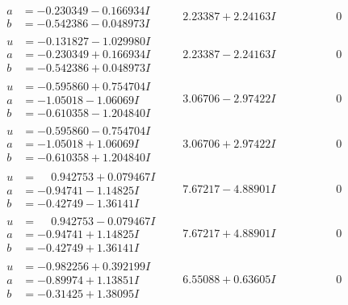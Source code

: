 \documentclass[1p]{elsarticle_modified}
\theoremstyle{definition}
\begin{document}
$$\begin{array}{c|c|c}
\begin{aligned}
a &= -0.230349 - 0.166934 I \\
b &= -0.542386 - 0.048973 I\end{aligned}
 & \phantom{-}2.23387 + 2.24163 I & \phantom{-0.000000 } 0 \\ \hline\begin{aligned}
u &= -0.131827 - 1.029980 I \\
a &= -0.230349 + 0.166934 I \\
b &= -0.542386 + 0.048973 I\end{aligned}
 & \phantom{-}2.23387 - 2.24163 I & \phantom{-0.000000 } 0 \\ \hline\begin{aligned}
u &= -0.595860 + 0.754704 I \\
a &= -1.05018 - 1.06069 I \\
b &= -0.610358 - 1.204840 I\end{aligned}
 & \phantom{-}3.06706 - 2.97422 I & \phantom{-0.000000 } 0 \\ \hline\begin{aligned}
u &= -0.595860 - 0.754704 I \\
a &= -1.05018 + 1.06069 I \\
b &= -0.610358 + 1.204840 I\end{aligned}
 & \phantom{-}3.06706 + 2.97422 I & \phantom{-0.000000 } 0 \\ \hline\begin{aligned}
u &= \phantom{-}0.942753 + 0.079467 I \\
a &= -0.94741 - 1.14825 I \\
b &= -0.42749 - 1.36141 I\end{aligned}
 & \phantom{-}7.67217 - 4.88901 I & \phantom{-0.000000 } 0 \\ \hline\begin{aligned}
u &= \phantom{-}0.942753 - 0.079467 I \\
a &= -0.94741 + 1.14825 I \\
b &= -0.42749 + 1.36141 I\end{aligned}
 & \phantom{-}7.67217 + 4.88901 I & \phantom{-0.000000 } 0 \\ \hline\begin{aligned}
u &= -0.982256 + 0.392199 I \\
a &= -0.89974 + 1.13851 I \\
b &= -0.31425 + 1.38095 I\end{aligned}
 & \phantom{-}6.55088 + 0.63605 I & \phantom{-0.000000 } 0 \\ \hline\begin{aligned}

\end{aligned}
\end{array}$$
\end{document}
